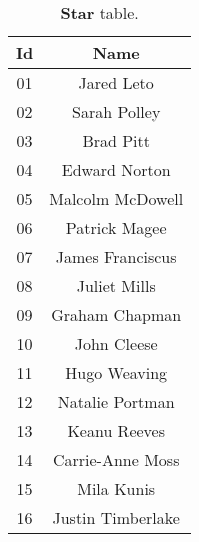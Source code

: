 	\begin{table}[H]
		\begin{center}
			\begin{tabular}{|c|c|}
				\hline
				\textbf{Id} & \textbf{Name} \\ \hline
				01 & Jared Leto \\ \hline
				02 & Sarah Polley \\ \hline
				03 & Brad Pitt \\ \hline
				04 & Edward Norton \\ \hline
				05 & Malcolm McDowell \\ \hline
				06 & Patrick Magee \\ \hline
				07 & James Franciscus \\ \hline
				08 & Juliet Mills \\ \hline
				09 & Graham Chapman \\ \hline
				10 & John Cleese \\ \hline
				11 & Hugo Weaving \\ \hline
				12 & Natalie Portman \\ \hline
				13 & Keanu Reeves \\ \hline
				14 & Carrie-Anne Moss \\ \hline
				15 & Mila Kunis \\ \hline
				16 & Justin Timberlake \\ \hline
			\end{tabular}
			\caption{\textbf{Star} table.}
		\end{center}
	\end{table}

